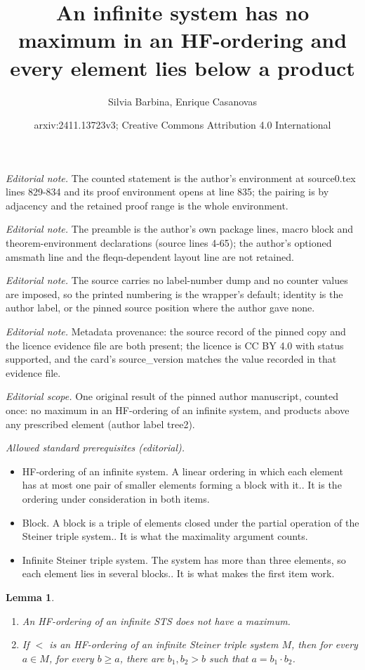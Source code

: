 \documentclass[10pt,a4paper]{article}
\title{An infinite system has no maximum in an HF-ordering and every element lies below a product}
\author{Silvia Barbina, Enrique Casanovas}
\date{arxiv:2411.13723v3; Creative Commons Attribution 4.0 International}
\theoremstyle{note}
\newtheorem{lemma}[thm]{Lemma}
\begin{document}
\maketitle
\noindent\textit{Editorial note.} The counted statement is the author's environment at source0.tex lines 829-834 and its proof environment opens at line 835; the pairing is by adjacency and the retained proof range is the whole environment.\par\medskip
\noindent\textit{Editorial note.} The preamble is the author's own package lines, macro block and theorem-environment declarations (source lines 4-65); the author's optioned amsmath line and the fleqn-dependent layout line are not retained.\par\medskip
\noindent\textit{Editorial note.} The source carries no label-number dump and no counter values are imposed, so the printed numbering is the wrapper's default; identity is the author label, or the pinned source position where the author gave none.\par\medskip
\noindent\textit{Editorial note.} Metadata provenance: the source record of the pinned copy and the licence evidence file are both present; the licence is CC BY 4.0 with status supported, and the card's source\_version matches the value recorded in that evidence file.\par\medskip
\noindent\textit{Editorial scope.} One original result of the pinned author manuscript, counted once: no maximum in an HF-ordering of an infinite system, and products above any prescribed element (author label tree2).\par\medskip
\noindent\textit{Allowed standard prerequisites (editorial).}\begin{itemize}
\item HF-ordering of an infinite system. A linear ordering in which each element has at most one pair of smaller elements forming a block with it.. It is the ordering under consideration in both items.
\item Block. A block is a triple of elements closed under the partial operation of the Steiner triple system.. It is what the maximality argument counts.
\item Infinite Steiner triple system. The system has more than three elements, so each element lies in several blocks.. It is what makes the first item work.
\end{itemize}\medskip
\begin{lemma}\label{tree2}
	\begin{enumerate}
		\item An HF-ordering of an infinite STS does not have a maximum.
		\item If $<$ is an HF-ordering of an infinite Steiner triple system $M$, then for every $a\in M$, for every  $b \geq a$, there are $b_1,b_2>b$ such that  $a=b_1\cdot b_2$.
	\end{enumerate}
\end{lemma}
\end{document}
